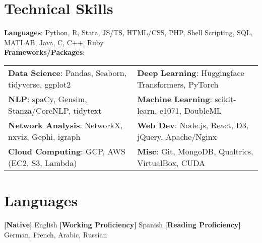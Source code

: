 \documentclass[letterpaper,11pt]{article}
\newcommand{\skfill}{\hfill}
\newcommand{\rpkg}[1]{#1}
\begin{document}
\section{Technical Skills}

\textbf{Languages}: Python, R, Stata, JS/TS, HTML/CSS, PHP, Shell Scripting, SQL, MATLAB, Java, C, C++, Ruby\vspace{2mm}\\

\textbf{Frameworks/Packages}:\vspace{1mm}
\setlength{}
\noindent\begin{tabularx}{\textwidth}{@{}bb@{}}
	\textbf{Data Science}: \skfill Pandas, \skfill Seaborn, \skfill \rpkg{tidyverse}, \skfill \rpkg{ggplot2} & \textbf{Deep} \textbf{Learning}: \skfill Huggingface Transformers, \skfill PyTorch\vspace{0.5mm}\\
	\textbf{NLP}: \skfill spaCy, \skfill Gensim, \skfill Stanza/CoreNLP, \skfill \rpkg{tidytext} & \textbf{Machine} \textbf{Learning}: \skfill scikit-learn, \skfill \rpkg{e1071}, \skfill DoubleML\vspace{0.5mm}\\
	\textbf{Network Analysis}: \skfill NetworkX, \skfill nxviz, \skfill Gephi, \skfill \rpkg{igraph} & \textbf{Web Dev}: \skfill Node.js, \skfill React, \skfill D3, \skfill jQuery, \skfill Apache/Nginx\vspace{0.5mm}\\
	\textbf{Cloud Computing}: GCP, \skfill AWS (EC2, S3, Lambda) & \textbf{Misc}: \skfill Git, \skfill MongoDB, \skfill Qualtrics, \skfill VirtualBox, \hfill CUDA \\
\end{tabularx}


\section{Languages}

\textbf{[Native]} English \textbf{[Working Proficiency]} Spanish \textbf{[Reading Proficiency]} German, French, Arabic, Russian

%
%
\end{document}
